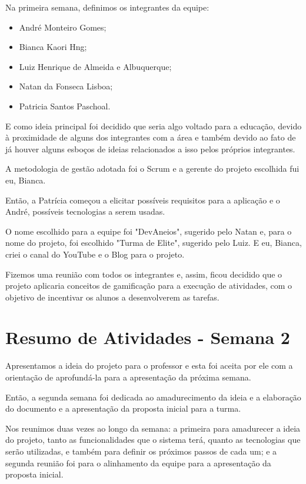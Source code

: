 \documentclass[
    12pt,               %
    openright,          %
    oneside,
    a4paper,            %
    english,            %
    brazil              %
    ]{ifsp-spo-inf-ctds} %
\begin{document}
\begin{apendicesenv}
Na primeira semana, definimos os integrantes da equipe:

\begin{itemize}
\item André Monteiro Gomes;
\item Bianca Kaori Hng;
\item Luiz Henrique de Almeida e Albuquerque;
\item Natan da Fonseca Lisboa;
\item Patricia Santos Paschoal.
\end{itemize}

E como ideia principal foi decidido que seria algo voltado para a educação, devido à proximidade de alguns dos integrantes com a área e também devido ao fato de já houver alguns esboços de ideias relacionados a isso pelos próprios integrantes. 

A metodologia de gestão adotada foi o Scrum e a gerente do projeto escolhida fui eu, Bianca.

Então, a Patrícia começou a elicitar possíveis requisitos para a aplicação e o André, possíveis tecnologias a serem usadas.

O nome escolhido para a equipe foi "DevAneios", sugerido pelo Natan e, para o nome do projeto, foi escolhido "Turma de Elite", sugerido pelo Luiz. E eu, Bianca, criei o canal do YouTube e o Blog para o projeto.

Fizemos uma reunião com todos os integrantes e, assim, ficou decidido que o projeto aplicaria conceitos de gamificação para a execução de atividades, com o objetivo de incentivar os alunos a desenvolverem as tarefas.


\section{Resumo de Atividades - Semana 2}
Apresentamos a ideia do projeto para o professor e esta foi aceita por ele com a orientação de aprofundá-la para a apresentação da próxima semana. 

Então, a segunda semana foi dedicada ao amadurecimento da ideia e a elaboração do documento e a apresentação da proposta inicial para a turma. 

Nos reunimos duas vezes ao longo da semana: a primeira para amadurecer a ideia do projeto, tanto as funcionalidades que o sistema terá, quanto as tecnologias que serão utilizadas, e também para definir os próximos passos de cada um; e a segunda reunião foi para o alinhamento da equipe para a apresentação da proposta inicial.


\end{apendicesenv}
\end{document}
